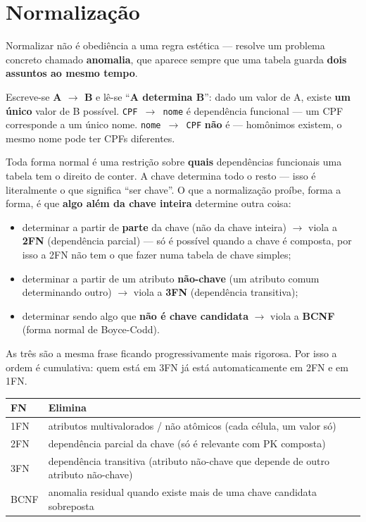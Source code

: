 \section{Normalização}
\label{sec:normalizacao}

\begin{conceito}
Normalizar não é obediência a uma regra estética --- resolve um problema
concreto chamado \textbf{anomalia}, que aparece sempre que uma tabela
guarda \textbf{dois assuntos ao mesmo tempo}.
\end{conceito}

\begin{conceito}
Escreve-se \textbf{A $\to$ B} e lê-se “\textbf{A determina B}”: dado um
valor de A, existe \textbf{um único} valor de B possível. \texttt{CPF
$\to$ nome} é dependência funcional --- um CPF corresponde a um único
nome. \texttt{nome $\to$ CPF} \textbf{não} é --- homônimos existem, o mesmo
nome pode ter CPFs diferentes.

Toda forma normal é uma restrição sobre \textbf{quais} dependências
funcionais uma tabela tem o direito de conter. A chave determina todo o
resto --- isso é literalmente o que significa “ser chave”. O que a
normalização proíbe, forma a forma, é que \textbf{algo além da chave
inteira} determine outra coisa:

\begin{itemize}
\item determinar a partir de \textbf{parte} da chave (não da chave
inteira) $\to$ viola a \textbf{2FN} (dependência parcial) --- só é
possível quando a chave é composta, por isso a 2FN não tem o que fazer
numa tabela de chave simples;
\item determinar a partir de um atributo \textbf{não-chave} (um atributo
comum determinando outro) $\to$ viola a \textbf{3FN} (dependência
transitiva);
\item determinar sendo algo que \textbf{não é chave candidata} $\to$
viola a \textbf{BCNF} (forma normal de Boyce-Codd).
\end{itemize}

As três são a mesma frase ficando progressivamente mais rigorosa. Por
isso a ordem é cumulativa: quem está em 3FN já está automaticamente em
2FN e em 1FN.
\end{conceito}

\begin{center}
\begin{tabular}{@{}p{2cm}p{9.4cm}@{}}
\toprule
\textbf{FN} & \textbf{Elimina} \\
\midrule
1FN & atributos multivalorados / não atômicos (cada célula, um valor só) \\
2FN & dependência parcial da chave (só é relevante com PK composta) \\
3FN & dependência transitiva (atributo não-chave que depende de outro
atributo não-chave) \\
BCNF & anomalia residual quando existe mais de uma chave candidata
sobreposta \\
\bottomrule
\end{tabular}
\end{center}

